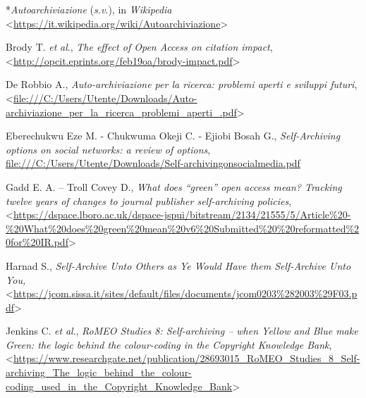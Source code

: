 \documentclass[
  b5paper,
  twoside,
  11pt,
  chapterprefix=false,
  bibliography=totocnumbered,
  parskip=0]{scrbook}
\begin{document}
*\emph{Autoarchiviazione} (\emph{s.v}.), in \emph{Wikipedia}
\textless{}\href{https://it.wikipedia.org/wiki/Autoarchiviazione}{{https://it.wikipedia.org/wiki/Autoarchiviazione}}\textgreater{}

Brody T. \emph{et} \emph{al}., \emph{The effect of Open Access on citation impact},
\textless{}\href{http://opcit.eprints.org/feb19oa/brody-impact.pdf}{{http://opcit.eprints.org/feb19oa/brody-impact.pdf}}\textgreater{}

De Robbio A., \emph{Auto-archiviazione per la ricerca: problemi aperti e
sviluppi futuri},
\textless{}\href{file:///C:/Users/Utente/Downloads/Auto-archiviazione_per_la_ricerca_problemi_aperti_.pdf}{{file:///C:/Users/Utente/Downloads/Auto-archiviazione\_per\_la\_ricerca\_problemi\_aperti\_.pdf}}\textgreater{}

Eberechukwu Eze M. - Chukwuma Okeji C. - Ejiobi Bosah G.,
\emph{Self-Archiving options on social networks: a review of options},
\href{file:///C:/Users/Utente/Downloads/Self-archivingonsocialmedia.pdf}{{file:///C:/Users/Utente/Downloads/Self-archivingonsocialmedia.pdf}}

Gadd E. A. -- Troll Covey D., \emph{What does \enquote{green} open access mean?
Tracking twelve years of changes to journal publisher self-archiving
policies},
\textless{}\href{https://dspace.lboro.ac.uk/dspace-jspui/bitstream/2134/21555/5/Article\%20-\%20What\%20does\%20green\%20mean\%20v6\%20Submitted\%20\%20reformatted\%20for\%20IR.pdf}{{https://dspace.lboro.ac.uk/dspace-jspui/bitstream/2134/21555/5/Article\%20-\%20What\%20does\%20green\%20mean\%20v6\%20Submitted\%20\%20reformatted\%20for\%20IR.pdf}}\textgreater{}

Harnad S., \emph{Self-Archive Unto Others as Ye Would Have them Self-Archive
Unto You,}
\textless{}\href{https://jcom.sissa.it/sites/default/files/documents/jcom0203\%282003\%29F03.pdf}{{https://jcom.sissa.it/sites/default/files/documents/jcom0203\%282003\%29F03.pdf}}\textgreater{}

Jenkins C. \emph{et} \emph{al}., \emph{RoMEO Studies 8: Self-archiving -- when Yellow
and Blue make Green: the logic behind the colour-coding in the Copyright
Knowledge Bank},
\textless{}\href{https://www.researchgate.net/publication/28693015_RoMEO_Studies_8_Self-archiving_The_logic_behind_the_colour-coding_used_in_the_Copyright_Knowledge_Bank}{{https://www.researchgate.net/publication/28693015\_RoMEO\_Studies\_8\_Self-archiving\_The\_logic\_behind\_the\_colour-coding\_used\_in\_the\_Copyright\_Knowledge\_Bank}}\textgreater{}
\end{document}
